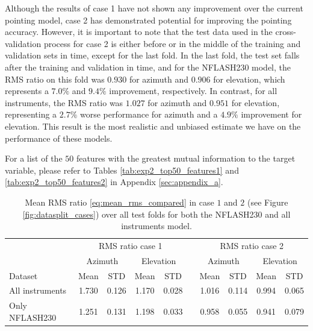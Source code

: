 Although the results of case 1 have not shown any improvement over the current pointing model, case 2 has demonstrated potential for improving the pointing accuracy.
However, it is important to note that the test data used in the cross-validation process for case 2 is either before or in the middle of the training and validation sets in time, except for the last fold.
In the last fold, the test set falls after the training and validation in time, and for the NFLASH230 model,
the RMS ratio on this fold was $0.930$ for azimuth and $0.906$ for elevation, which represents a $7.0\%$ and $9.4\%$ improvement, respectively.
In contrast, for all instruments, the RMS ratio was $1.027$ for azimuth and $0.951$ for elevation, representing a $2.7\%$ worse performance for azimuth and a $4.9\%$ improvement for elevation.
This result is the most realistic and unbiased estimate we have on the performance of these models.

For a list of the $50$ features with the greatest mutual information to the target variable, please refer to Tables \ref{tab:exp2_top50_features1} and \ref{tab:exp2_top50_features2} in Appendix \ref{sec:appendix_a}.

\begin{table}[!htbp]
    \centering %
    \caption[Mean RMS ratio for NFLASH230 and all instruments model]{
    Mean RMS ratio \eqref{eq:mean_rms_compared} in case $1$ and $2$ (see Figure \ref{fig:datasplit_cases}) over all test folds for both the NFLASH230 and all instruments model.}
    \begin{tabular}{lcccc c cccc}
        \toprule
        \multicolumn{1}{c}{} & \multicolumn{4}{c}{RMS ratio case 1} & & \multicolumn{4}{c}{RMS ratio case 2} \\
        \cmidrule(lr){2-5} \cmidrule(lr){7-10}
        \multicolumn{1}{c}{} & \multicolumn{2}{c}{Azimuth} & \multicolumn{2}{c}{Elevation} & & \multicolumn{2}{c}{Azimuth} & \multicolumn{2}{c}{Elevation} \\ 
        \cmidrule(lr){2-5} \cmidrule(lr){7-10}
        Dataset &  Mean &  STD &  Mean &  STD & & Mean &  STD &  Mean &  STD \\
        \midrule
        All instruments   &     1.730 &     0.126 &     1.170 &     0.028 &  &   1.016 &     0.114 &     0.994 &     0.065 \\
        Only NFLASH230    &     1.251 &     0.131 &     1.198 &     0.033 &  &   0.958 &     0.055 &     0.941 &     0.079 \\
        \bottomrule
    \end{tabular}
    \label{tab:results_minval_days04}
\end{table}



